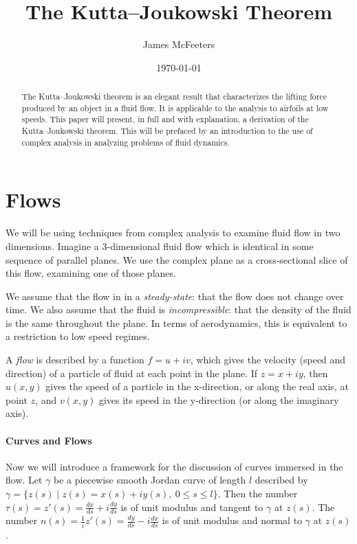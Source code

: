 \documentclass[letterpaper, twoside, 12 pt]{article}
\title{The Kutta--Joukowski Theorem}
\date{\today}
\author{James McFeeters}
\begin{document}
	\maketitle
	\setcounter{y}{0}

\begin{abstract}
	The Kutta--Joukowski theorem is an elegant result that characterizes the lifting force produced by an object in a fluid flow. 
	It is applicable to the analysis to airfoils at low speeds.
	This paper will present, in full and with explanation, a derivation of the Kutta--Joukowski theorem.
	This will be prefaced by an introduction to the use of complex analysis in analyzing problems of fluid dynamics.
\end{abstract}

\setlength{\parindent}{0 pt}
\setlength{\parskip}{1 em}

\section{Flows} %
\label{sec:flows}
	We will be using techniques from complex analysis to examine fluid flow in two dimensions.
	Imagine a 3-dimensional fluid flow which is identical in some sequence of parallel planes.
	We use the complex plane as a cross-sectional slice of this flow, examining one of those planes.

	We assume that the flow in in a \textit{steady-state}: that the flow does not change over time.
	We also assume that the fluid is \textit{incompressible}: that the density of the fluid is the same throughout the plane.
	In terms of aerodynamics, this is equivalent to a restriction to low speed regimes.

	\begin{definition}[Flow]
		A \textit{flow} is described by a function $f = u + iv$, which gives the velocity (speed and direction) of a particle of fluid at each point in the plane.
		If $z = x + iy$, then $u(x, y)$ gives the speed of a particle in the x-direction, or along the real axis, at point $z$, and $v(x, y)$ gives its speed in the y-direction (or along the imaginary axis).
	\end{definition}

	\paragraph*{Curves and Flows}
	Now we will introduce a framework for the discussion of curves immersed in the flow.
	Let $\gamma$ be a piecewise smooth Jordan curve of length $l$ described by $\gamma = \{ z(s) \mid z(s) = x(s) + i y(s), \ 0 \leq s \leq l \}$.
	Then the number $\tau(s) = z'(s) = \frac{dx}{ds} + i \frac{dy}{ds}$ is of unit modulus and tangent to $\gamma$ at $z(s)$.
	The number $n(s) = \frac{1}{i} z'(s) = \frac{dy}{ds} - i \frac{dx}{ds}$ is of unit modulus and normal to $\gamma$ at $z(s)$.
\end{document}
